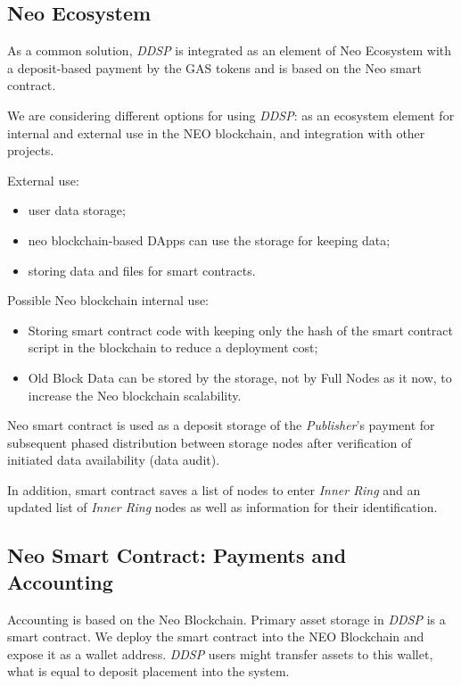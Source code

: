 \documentclass[a4paper, 11pt]{article}
\begin{document}
\subsection{Neo Ecosystem}

As a common solution, \textit{DDSP} is integrated
as an element of Neo Ecosystem with a deposit-based payment by the GAS tokens and 
is based on the Neo smart contract. 

We are considering different options for using \textit{DDSP}: as an ecosystem element for 
internal and external use in the NEO blockchain, and integration with other projects.

External use:
\begin{itemize}
\item user data storage;
\item neo blockchain-based DApps can use the storage for keeping data;
\item storing data and files for smart contracts.
\end{itemize}

Possible Neo blockchain internal use:
\begin{itemize}
\item Storing smart contract code with keeping only the hash of the smart contract script in the blockchain to reduce a deployment cost;
\item Old Block Data can be stored by the storage, not by Full Nodes as it now, to increase the Neo blockchain scalability.
\end{itemize}

Neo smart contract is used as a
deposit storage of the \textit{Publisher}'s payment for subsequent phased
distribution between storage nodes after verification of initiated data
availability (data audit). 

In addition, smart contract saves a list of nodes to enter \textit{Inner
  Ring} and an updated list of \textit{Inner Ring} nodes as well as information
for their identification.

\subsection{Neo Smart Contract: Payments and Accounting}

Accounting is based on the Neo Blockchain. Primary asset storage in \textit{DDSP} is a
smart contract. We deploy the smart contract into the NEO Blockchain and expose it as a
wallet address. \textit{DDSP} users might transfer assets to this wallet, what is equal
to deposit placement into the system.
\end{document}
